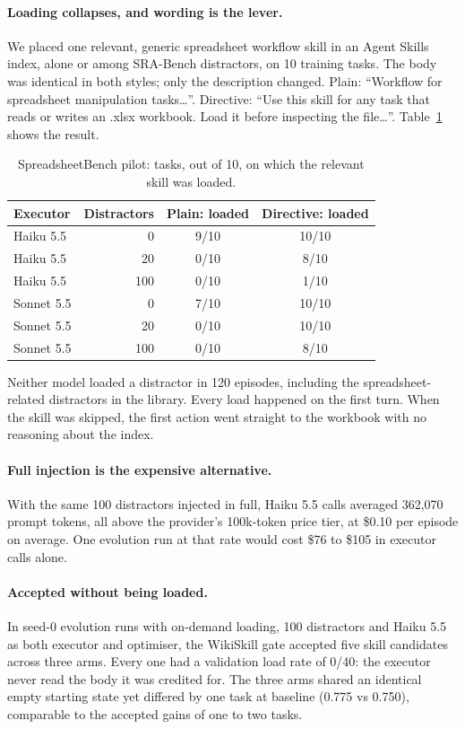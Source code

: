\documentclass[11pt]{article}
\begin{document}
\paragraph{Loading collapses, and wording is the lever.} We placed one relevant, generic spreadsheet workflow skill in an Agent Skills index, alone or among SRA-Bench distractors, on 10 training tasks. The body was identical in both styles; only the description changed. Plain: ``Workflow for spreadsheet manipulation tasks\ldots''. Directive: ``Use this skill for any task that reads or writes an .xlsx workbook. Load it before inspecting the file\ldots''. Table~\ref{tab:pilot} shows the result.

\begin{table}[t]
\centering
\caption{SpreadsheetBench pilot: tasks, out of 10, on which the relevant skill was loaded.}
\label{tab:pilot}
\begin{tabular}{lrcc}
\toprule
Executor & Distractors & Plain: loaded & Directive: loaded \\
\midrule
Haiku 5.5 & 0 & 9/10 & 10/10 \\
Haiku 5.5 & 20 & 0/10 & 8/10 \\
Haiku 5.5 & 100 & 0/10 & 1/10 \\
\midrule
Sonnet 5.5 & 0 & 7/10 & 10/10 \\
Sonnet 5.5 & 20 & 0/10 & 10/10 \\
Sonnet 5.5 & 100 & 0/10 & 8/10 \\
\bottomrule
\end{tabular}
\end{table}

Neither model loaded a distractor in 120 episodes, including the spreadsheet-related distractors in the library. Every load happened on the first turn. When the skill was skipped, the first action went straight to the workbook with no reasoning about the index.

\paragraph{Full injection is the expensive alternative.} With the same 100 distractors injected in full, Haiku 5.5 calls averaged 362,070 prompt tokens, all above the provider's 100k-token price tier, at \$0.10 per episode on average. One evolution run at that rate would cost \$76 to \$105 in executor calls alone.

\paragraph{Accepted without being loaded.} In seed-0 evolution runs with on-demand loading, 100 distractors and Haiku 5.5 as both executor and optimiser, the WikiSkill gate accepted five skill candidates across three arms. Every one had a validation load rate of 0/40: the executor never read the body it was credited for. The three arms shared an identical empty starting state yet differed by one task at baseline (0.775 vs 0.750), comparable to the accepted gains of one to two tasks.
\end{document}
